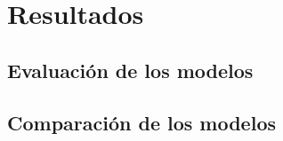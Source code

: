 \section{Resultados}
\lipsum[1]
\subsection{Evaluación de los modelos}
\lipsum[1]
\subsection{Comparación de los modelos}
\lipsum[1]
\clearpage



